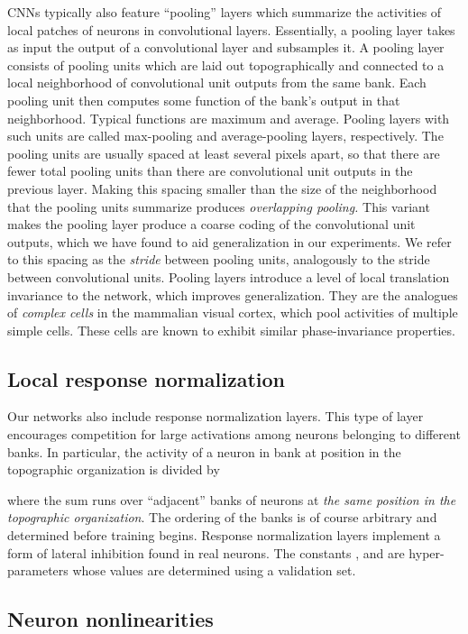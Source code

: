 \documentclass[12pt]{article}
\begin{document}
CNNs typically also feature {}``pooling'' layers which summarize
the activities of local patches of neurons in convolutional layers.
Essentially, a pooling layer takes as input the output of a convolutional
layer and subsamples it. A pooling layer consists of pooling units
which are laid out topographically and connected to a local neighborhood
of convolutional unit outputs from the same bank. Each pooling unit
then computes some function of the bank's output in that neighborhood.
Typical functions are maximum and average. Pooling layers with such
units are called max-pooling and average-pooling layers, respectively.
The pooling units are usually spaced at least several pixels apart,
so that there are fewer total pooling units than there are convolutional
unit outputs in the previous layer. Making this spacing smaller than
the size of the neighborhood that the pooling units summarize produces
\emph{overlapping pooling.} This variant makes the pooling
layer produce a coarse coding of the convolutional unit outputs, which
we have found to aid generalization in our experiments. We refer to
this spacing as the \emph{stride} between pooling units, analogously
to the stride between convolutional units. Pooling layers introduce
a level of local translation invariance to the network, which improves
generalization. They are the analogues of \emph{complex cells} in
the mammalian visual cortex, which pool activities of multiple simple
cells. These cells are known to exhibit similar phase-invariance properties.


\subsection{Local response normalization}

Our networks also include response normalization layers. This type
of layer encourages competition for large activations among neurons
belonging to different banks. In particular, the activity 
of a neuron in bank  at position  in the topographic organization
is divided by 

where the sum runs over  {}``adjacent'' banks of neurons at
\emph{the same position in the topographic organization}. The
ordering of the banks is of course arbitrary and determined before
training begins. Response normalization layers implement a form of
lateral inhibition found in real neurons. The constants ,
and  are hyper-parameters whose values are determined using
a validation set.


\subsection{Neuron nonlinearities}
\end{document}
